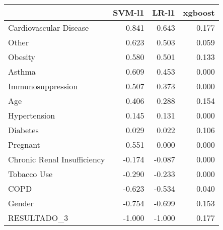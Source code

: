\begin{tabular}{lrrr}
\toprule
{} &  SVM-l1 &  LR-l1 &  xgboost \\
\midrule
Cardiovascular Disease      &   0.841 &  0.643 &    0.177 \\
Other                       &   0.623 &  0.503 &    0.059 \\
Obesity                     &   0.580 &  0.501 &    0.133 \\
Asthma                      &   0.609 &  0.453 &    0.000 \\
Immunosuppression           &   0.507 &  0.373 &    0.000 \\
Age                         &   0.406 &  0.288 &    0.154 \\
Hypertension                &   0.145 &  0.131 &    0.000 \\
Diabetes                    &   0.029 &  0.022 &    0.106 \\
Pregnant                    &   0.551 &  0.000 &    0.000 \\
Chronic Renal Insufficiency &  -0.174 & -0.087 &    0.000 \\
Tobacco Use                 &  -0.290 & -0.233 &    0.000 \\
COPD                        &  -0.623 & -0.534 &    0.040 \\
Gender                      &  -0.754 & -0.699 &    0.153 \\
RESULTADO\_3                 &  -1.000 & -1.000 &    0.177 \\
\bottomrule
\end{tabular}
